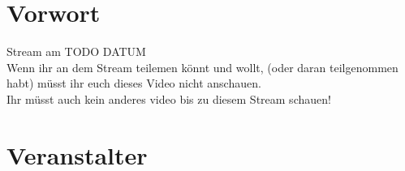 

\usepackage{listings}
\usepackage{tikz}



\subtitle{Organisatorisches}
\maketitle

\section{Vorwort}
\begin{frame}
	\slidehead
	\begin{center}
		\vspace{1cm}
		{\Huge Stream am TODO DATUM}\\
		\vspace{1cm}
		Wenn ihr an dem Stream teilemen könnt und wollt, (oder daran teilgenommen habt) müsst ihr euch dieses Video nicht anschauen.\\
		Ihr müsst auch kein anderes video bis zu diesem Stream schauen!
	\end{center}
\end{frame}

\section{Veranstalter}
